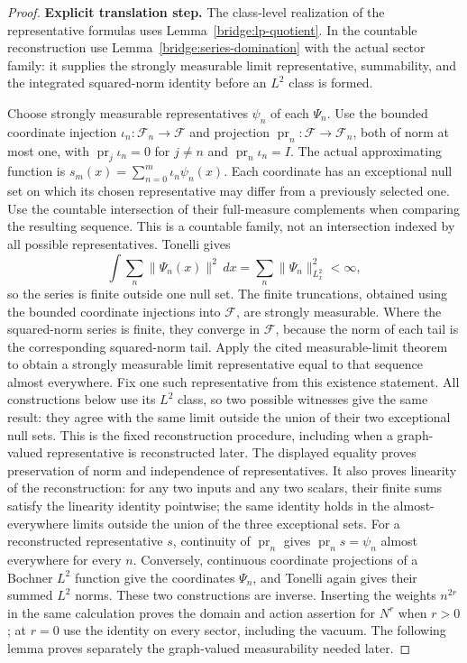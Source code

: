 \documentclass[11pt,a4paper]{article}
\theoremstyle{definition}
\theoremstyle{remark}
\begin{document}
\begin{proof}
\noindent\textbf{Explicit translation step.} The class-level realization of the representative formulas uses
Lemma~\ref{bridge:lp-quotient}. In the countable reconstruction use
Lemma~\ref{bridge:series-domination} with the actual sector family:
it supplies the strongly measurable limit representative, summability,
and the integrated squared-norm identity before an $L^2$ class is formed.

Choose strongly measurable representatives $\psi_n$ of each $\Psi_n$.
Use the bounded coordinate injection $\iota_n:\mathcal F_n\to\mathcal F$
and projection $\operatorname{pr}_n:\mathcal F\to\mathcal F_n$,
both of norm at most one, with
$\operatorname{pr}_j\iota_n=0$ for $j\ne n$ and
$\operatorname{pr}_n\iota_n=I$. The actual approximating function is
$s_m(x)=\sum_{n=0}^m\iota_n\psi_n(x)$.
Each coordinate has an exceptional null set on which its chosen
representative may differ from a previously selected one. Use the
countable intersection of their full-measure complements when comparing
the resulting sequence. This is a countable family, not an intersection
indexed by all possible representatives.
Tonelli gives
\[
 \int\sum_n\|\Psi_n(x)\|^2\,dx
             =\sum_n\|\Psi_n\|_{L^2_x}^2<\infty,
\]
so the series is finite outside one null set. The finite truncations,
obtained using the bounded coordinate injections into $\mathcal F$,
are strongly measurable. Where the squared-norm series is finite,
they converge in $\mathcal F$, because the norm of each tail is the
corresponding squared-norm tail. Apply the cited measurable-limit
theorem to obtain a strongly measurable limit representative equal to
that sequence almost everywhere. Fix one such representative from
this existence statement. All constructions below use its $L^2$
class, so two possible witnesses give the same result: they agree
with the same limit outside the union of their two exceptional
null sets. This is the fixed reconstruction procedure, including
when a graph-valued representative is reconstructed later.
The displayed equality proves preservation of norm and independence
of representatives. It also proves linearity of the reconstruction:
for any two inputs and any two scalars, their finite sums satisfy
the linearity identity pointwise; the same identity holds in the
almost-everywhere limits outside the union of the three exceptional
sets. For a reconstructed representative $s$, continuity of
$\operatorname{pr}_n$ gives $\operatorname{pr}_ns=\psi_n$ almost
everywhere for every $n$. Conversely, continuous coordinate projections of
a Bochner $L^2$ function give the coordinates $\Psi_n$, and Tonelli
again gives their summed $L^2$ norms. These two constructions are
inverse. Inserting the weights $n^{2r}$ in the same calculation proves
the domain and action assertion for $N^r$ when $r>0$; at $r=0$ use
the identity on every sector, including the vacuum. The following
lemma proves separately the graph-valued measurability needed later.
\end{proof}
\end{document}
